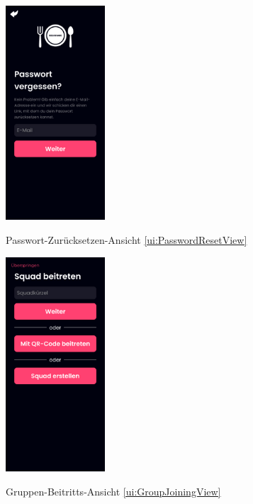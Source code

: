 \documentclass[parskip=full]{scrartcl}
\begin{document}
\begin{figure}[htp]
    \begin{minipage}
        [t]{0.49\textwidth}
        \centering
        \includegraphics[height=80mm]{images/ui/PasswordResetView.jpg}
        \label{fig:PasswordResetView}
        \caption{Passwort-Zurücksetzen-Ansicht \ref{ui:PasswordResetView}}
    \end{minipage}
    \begin{minipage}
        [t]{0.49\textwidth}
        \centering
        \includegraphics[height=80mm]{images/ui/GroupJoiningView.jpg}
        \label{fig:GroupJoiningView}
        \caption{Gruppen-Beitritts-Ansicht \ref{ui:GroupJoiningView}}
    \end{minipage}
\end{figure}
\end{document}
